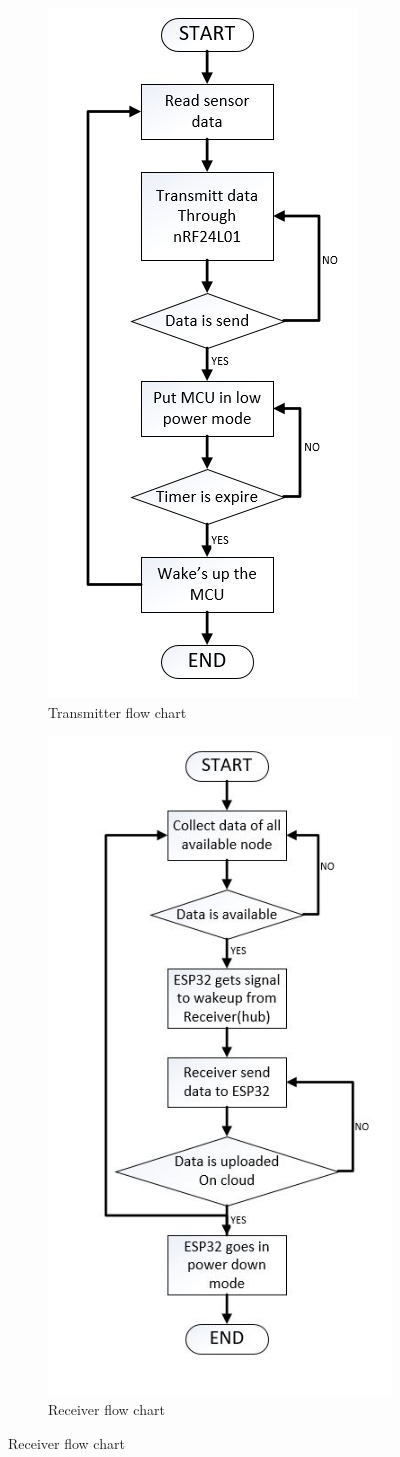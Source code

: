 \documentclass[a4paper,12pt,oneside]{book}
\begin{document}
\begin{figure}[H]
\centering
\begin{subfigure}{0.5\textwidth}
\centering
\includegraphics[width=0.5\linewidth]{trance_flow_snap.JPG}
\caption{Transmitter flow chart}
\end{subfigure}
\begin{subfigure}{0.5\textwidth}
\centering
\includegraphics[width=0.50\linewidth]{receiver_flow_snap.JPG}
\caption{Receiver flow chart}
\end{subfigure}
\end{figure}
\end{document}
